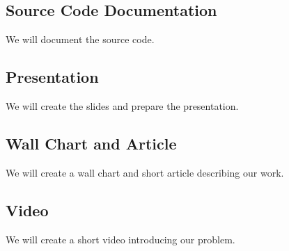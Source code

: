 \subsection{Source Code Documentation}\label{subsec:source-code-documentation}
We will document the source code.

\subsection{Presentation}\label{subsec:presentation}
We will create the slides and prepare the presentation.

\subsection{Wall Chart and Article}\label{subsec:wall-chart-and-article}
We will create a wall chart and short article describing our work.

\subsection{Video}\label{subsec:video}
We will create a short video introducing our problem.